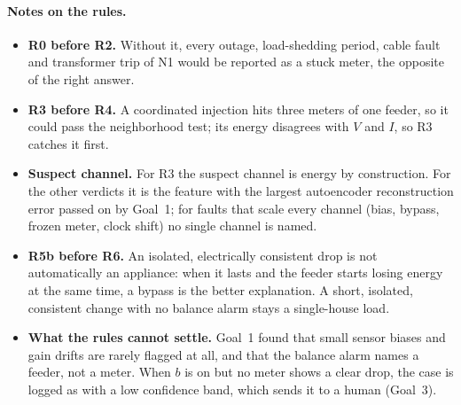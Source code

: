 \paragraph{Notes on the rules.}
\begin{itemize}[leftmargin=*,itemsep=2pt]
  \item \textbf{R0 before R2.} Without it, every outage, load-shedding period, cable fault and transformer trip
        of N1 would be reported as a stuck meter, the opposite of the right answer.
  \item \textbf{R3 before R4.} A coordinated injection hits three meters of one feeder, so it could pass the
        neighborhood test; its energy disagrees with $V$ and $I$, so R3 catches it first.
  \item \textbf{Suspect channel.} For R3 the suspect channel is energy by construction. For the other
        verdicts it is the feature with the largest autoencoder reconstruction error passed on by Goal~1; for
        faults that scale every channel (bias, bypass, frozen meter, clock shift) no single channel is
        named.
  \item \textbf{R5b before R6.} An isolated, electrically consistent drop is not automatically an appliance:
        when it lasts and the feeder starts losing energy at the same time, a bypass is the better
        explanation. A short, isolated, consistent change with no balance alarm stays a single-house load.
  \item \textbf{What the rules cannot settle.} Goal~1 found that small sensor biases and gain drifts are
        rarely flagged at all, and that the balance alarm names a feeder, not a meter. When $b$ is on but no
        meter shows a clear drop, the case is logged as \SD{} with a low confidence band, which sends it to
        a human (Goal~3).
\end{itemize}


